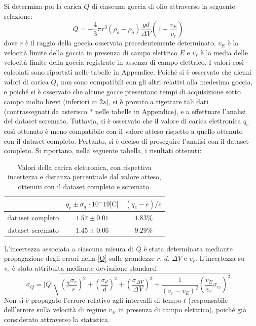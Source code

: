 \documentclass[]{article}
\newcommand{\abs}[1]{\left\lvert#1\right\rvert}
\begin{document}
    Si determina poi la carica $Q$ di ciascuna goccia di olio attraverso la seguente relazione:
    \begin{equation}
        \label{Q}
        Q = -\frac{4}{3} \pi r^3 \left( \rho_o - \rho_a \right) \frac{g d}{\Delta V} \left( 1 - \frac{v_E}{v_r} \right)
    \end{equation}
    dove $r$ è il raggio della goccia osservata precedentemente determinato, $v_E$ è la velocità limite della goccia in presenza di campo elettrico $E$ e $v_r$ è la media delle velocità limite della goccia registrate in assenza di campo elettrico.
    I valori così calcolati sono riportati nelle tabelle in Appendice. 
    Poiché si è osservato che alcuni valori di carica $Q_i$ non sono compatibili con gli altri relativi alla medesima goccia, e poiché si è osservato che alcune gocce presentano tempi di acquisizione sotto campo molto brevi (inferiori ai $2s$), si è provato a rigettare tali dati (contrassegnati da asterisco $\ast$ nelle tabelle in Appendice), e a effettuare l'analisi del dataset scremato. Tuttavia, si è osservato che il valore di carica elettronica $q_e$ così ottenuto è meno compatibile con il valore atteso rispetto a quello ottenuto con il dataset completo. Pertanto, si è deciso di proseguire l'analisi con il dataset completo. Si riportano, nella seguente tabella, i risultati ottenuti:

    \begin{table}[H]
        \centering
    
        \begin{tabular}{|| c || c | c||}
            \hline
            $ $ & $q_e \pm \sigma_{q}\, \cdot 10^-{19} \text{[C]} $ & $ (q_e - e)/e$\\
            \hline\hline
    
            $\text{dataset completo}$ & $ 1.57 \pm 0.01 $ & $1.83 \%$\\\hline
            $\text{dataset scremato}$ & $ 1.45 \pm 0.06 $ & $9.29 \%$ \\\hline
        \end{tabular}
        \caption{Valori della carica elettronica, con rispettiva incertezza e distanza percentuale dal valore atteso, ottenuti con il dataset completo e scremato.}
        \label{carica-eletronica}
    \end{table}

    L'incertezza associata a ciascuna misura di $Q$ è stata determinata mediante propagazione degli errori nella \ref{Q} sulle grandezze $r$, $d$, $\Delta V$ e $v_r$. L'incertezza su $v_r$ è stata attribuita mediante deviazione standard.
    \begin{equation}
        \label{sigma-Q}
        \sigma_Q = \abs{Q} \sqrt{ \left( 3 \frac{\sigma_r}{r} \right)^2 + \left( \frac{\sigma_d}{d} \right)^2 + \left( \frac{\sigma_{\Delta V}}{\Delta V} \right)^2 + \frac{1}{\left( v_r - v_E \right)^2}\left( \frac{v_E}{v_r} \sigma_{v_r} \right)^2 }
    \end{equation}
    Non si è propagato l'errore relativo agli intervalli di tempo $t$ (responsabile dell'errore sulla velocità di regime $v_E$ in presenza di campo elettrico), poiché già considerato attraverso la statistica.
\end{document}
